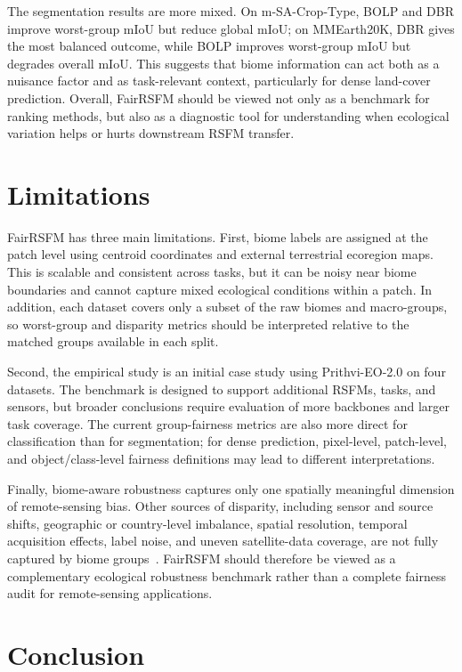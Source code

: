 \documentclass[10pt,twocolumn,letterpaper]{article}
\newcommand{\method}{FairRSFM\xspace}
\begin{document}
The segmentation results are more mixed. On m-SA-Crop-Type, BOLP and DBR improve worst-group mIoU but reduce global mIoU; on MMEarth20K, DBR gives the most balanced outcome, while BOLP improves worst-group mIoU but degrades overall mIoU. This suggests that biome information can act both as a nuisance factor and as task-relevant context, particularly for dense land-cover prediction. Overall, \method should be viewed not only as a benchmark for ranking methods, but also as a diagnostic tool for understanding when ecological variation helps or hurts downstream RSFM transfer.

\section{Limitations}

\method has three main limitations. First, biome labels are assigned at the patch level using centroid coordinates and external terrestrial ecoregion maps. This is scalable and consistent across tasks, but it can be noisy near biome boundaries and cannot capture mixed ecological conditions within a patch. In addition, each dataset covers only a subset of the raw biomes and macro-groups, so worst-group and disparity metrics should be interpreted relative to the matched groups available in each split.

Second, the empirical study is an initial case study using Prithvi-EO-2.0 on four datasets. The benchmark is designed to support additional RSFMs, tasks, and sensors, but broader conclusions require evaluation of more backbones and larger task coverage. The current group-fairness metrics are also more direct for classification than for segmentation; for dense prediction, pixel-level, patch-level, and object/class-level fairness definitions may lead to different interpretations.

Finally, biome-aware robustness captures only one spatially meaningful dimension of remote-sensing bias. Other sources of disparity, including sensor and source shifts, geographic or country-level imbalance, spatial resolution, temporal acquisition effects, label noise, and uneven satellite-data coverage, are not fully captured by biome groups~\cite{geobs2025,earthshift2026,coveragebias_satellite}. \method should therefore be viewed as a complementary ecological robustness benchmark rather than a complete fairness audit for remote-sensing applications.


\section{Conclusion}
\end{document}
